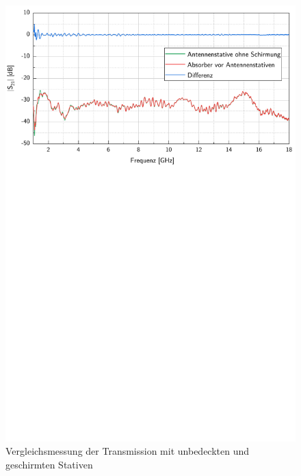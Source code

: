 \begin{figure}[ht]
    \centering
    \includegraphics[page=1, width=.99\textwidth, trim = 0cm 15.6cm 0cm 0cm]{Abbildungen/Kapitel4/Messergebnisse/Vergleich Absorber vor Antennenstativen.pdf}
    \caption{Vergleichsmessung der Transmission mit unbedeckten und geschirmten Stativen}
    \label{fig:4_Vergleich_Absorber_vor_Stativen}
\end{figure}


